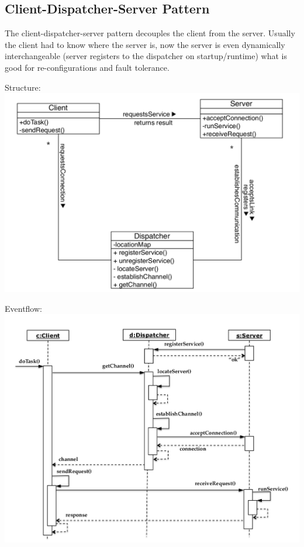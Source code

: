 \subsection{Client-Dispatcher-Server Pattern}
The client-dispatcher-server pattern decouples the client from the server.
Usually the client had to know where the server is, now the server is even dynamically interchangeable (server registers to the dispatcher on startup/runtime) what is good for re-configurations and fault tolerance.\\
\begin{minipage}{.5\textwidth}
  Structure:\\
  \includegraphics[width=\linewidth]{images/pattern_client_dispatcher_server.png}\\
\end{minipage}
\begin{minipage}{.5\textwidth}
  \vspace{1em}
  Eventflow:\\
  \includegraphics[width=\linewidth]{images/eventflow_client_dispatcher_server.png}
\end{minipage}\\
